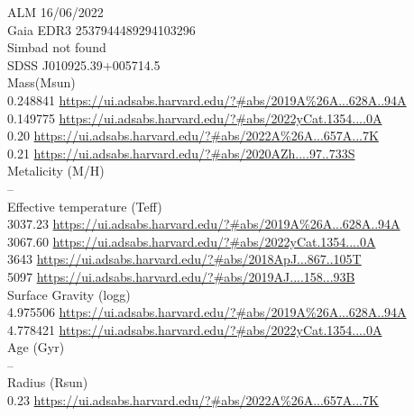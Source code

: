 ALM 16/06/2022\\
Gaia EDR3 2537944489294103296\\
Simbad not found\\
SDSS J010925.39+005714.5\\
Mass(Msun)\\
0.248841 \url{https://ui.adsabs.harvard.edu/?#abs/2019A%26A...628A..94A}\\
0.149775 \url{https://ui.adsabs.harvard.edu/?#abs/2022yCat.1354....0A}\\
0.20 \url{https://ui.adsabs.harvard.edu/?#abs/2022A%26A...657A...7K}\\
0.21 \url{https://ui.adsabs.harvard.edu/?#abs/2020AZh....97..733S}\\
Metalicity (M/H)\\
--\\
Effective temperature (Teff) \\
3037.23 \url{https://ui.adsabs.harvard.edu/?#abs/2019A%26A...628A..94A}\\
3067.60 \url{https://ui.adsabs.harvard.edu/?#abs/2022yCat.1354....0A}\\
3643 \url{https://ui.adsabs.harvard.edu/?#abs/2018ApJ...867..105T}\\
5097 \url{https://ui.adsabs.harvard.edu/?#abs/2019AJ....158...93B}\\
Surface Gravity (logg) \\
4.975506 \url{https://ui.adsabs.harvard.edu/?#abs/2019A%26A...628A..94A}\\
4.778421 \url{https://ui.adsabs.harvard.edu/?#abs/2022yCat.1354....0A}\\
Age (Gyr)\\
--\\
Radius (Rsun)\\
0.23 \url{https://ui.adsabs.harvard.edu/?#abs/2022A%26A...657A...7K}\\
